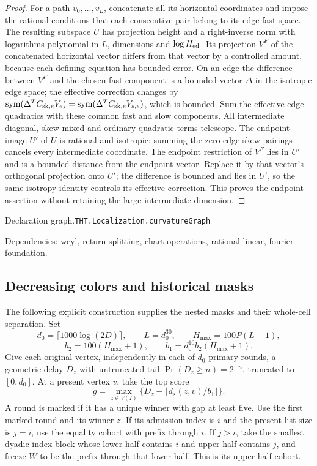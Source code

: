 \documentclass[11pt]{article}
\theoremstyle{definition}
\newcommand{\sym}{\operatorname{sym}}
\numberwithin{equation}{section}
\newcommand{\bp}[3]{\par\smallskip\begingroup\footnotesize
\noindent\hypertarget{bp:#1}{\textsf{Declaration #1.}}\quad\nolinkurl{#2}\par
\noindent\textsf{Dependencies:} #3.\par\endgroup\smallskip}
\begin{document}
\begin{proof}
For a path $v_0,\ldots,v_L$, concatenate all its horizontal coordinates and impose the rational conditions that each consecutive pair belong to its edge fast space. The resulting subspace $U$ has projection height and a right-inverse norm with logarithms polynomial in $L$, dimensions and $\log H_{\rm ed}$. Its projection $V^F$ of the concatenated horizontal vector differs from that vector by a controlled amount, because each defining equation has bounded error. On an edge the difference between $V^F$ and the chosen fast component is a bounded vector $\Delta$ in the isotropic edge space; the effective correction changes by $\sym(\Delta^TC_{{\rm sk},e}V_e)=\sym(\Delta^TC_{{\rm sk},e}V_{s,e})$, which is bounded. Sum the effective edge quadratics with these common fast and slow components. All intermediate diagonal, skew-mixed and ordinary quadratic terms telescope. The endpoint image $U'$ of $U$ is rational and isotropic: summing the zero edge skew pairings cancels every intermediate coordinate. The endpoint restriction of $V^F$ lies in $U'$ and is a bounded distance from the endpoint vector. Replace it by that vector's orthogonal projection onto $U'$; the difference is bounded and lies in $U'$, so the same isotropy identity controls its effective correction. This proves the endpoint assertion without retaining the large intermediate dimension.
\end{proof}
\bp{graph}{THT.Localization.curvatureGraph}{weyl, return-splitting, chart-operations, rational-linear, fourier-foundation}


\subsection{Decreasing colors and historical masks}
The following explicit construction supplies the nested masks and their whole-cell separation. Set
\[
 d_0=\lceil1000\log(2D)\rceil,\qquad L=d_0^{30},\qquad H_{\max}=100P(L+1),
\]
\[
 b_2=100(H_{\max}+1),\qquad b_1=d_0^{10}b_2(H_{\max}+1).
\]
Give each original vertex, independently in each of $d_0$ primary rounds, a geometric delay $D_z$ with untruncated tail $\Pr(D_z\ge n)=2^{-n}$, truncated to $[0,d_0]$. At a present vertex $v$, take the top score
\[
 g=\max_{z\in V(I)}\{D_z-\lfloor d_s(z,v)/b_1\rfloor\}.
\]
A round is marked if it has a unique winner with gap at least five. Use the first marked round and its winner $z$. If its admission index is $i$ and the present list size is $j=i$, use the equality cohort with prefix through $i$. If $j>i$, take the smallest dyadic index block whose lower half contains $i$ and upper half contains $j$, and freeze $W$ to be the prefix through that lower half. This is its upper-half cohort.
\end{document}

